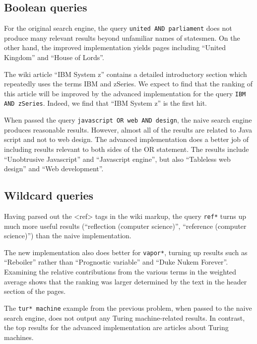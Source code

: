 \documentclass[11pt]{article}
\begin{document}
\subsection*{Boolean queries}

For the original search engine, the query \texttt{united AND parliament} does not produce many relevant
results beyond unfamiliar names of statesmen. On the other hand, the improved implementation yields
pages including ``United Kingdom'' and ``House of Lords''.

The wiki article ``IBM System z'' contains a detailed introductory section which repeatedly uses
the terms IBM and zSeries. We expect to find that the ranking of this article will be improved
by the advanced implementation for the query \texttt{IBM AND zSeries}. Indeed, we find that
``IBM System z'' is the first hit.

When passed the query \texttt{javascript OR web AND design}, the naive search engine produces
reasonable results. However, almost all of the results are related to Java script and not to
web design. The advanced implementation does a better job of including results relevant to
both sides of the OR statement. The results include ``Unobtrusive Javascript'' and ``Javascript engine'',
but also ``Tableless web design'' and ``Web development''.

\subsection*{Wildcard queries}

Having parsed out the <ref> tags in the wiki markup, the query \texttt{ref*} turns up much more useful
results (``reflection (computer science)'', ``reference (computer science)'') than the naive implementation.

The new implementation also does better for \texttt{vapor*}, turning up results such as ``Reboiler'' rather
than ``Prognostic variable'' and ``Duke Nukem Forever''. Examining the relative contributions from the
various terms in the weighted average shows that the ranking was larger determined by the text in the header
section of the pages.

The \texttt{tur* machine} example from the previous problem, when passed to the naive search engine, does not output
any Turing machine-related results. In contrast, the top results for
the advanced implementation are articles about Turing machines.
\end{document}
